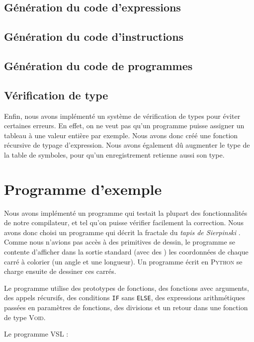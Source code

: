 \documentclass[french]{article}
\begin{document}
  \subsection{Génération du code d'expressions}
  \subsection{Génération du code d'instructions}

  \subsection{Génération du code de programmes}
  \subsection{Vérification de type}
  Enfin, nous avons implémenté un système de vérification de types pour éviter certaines erreurs. En effet, on ne veut pas qu'un programme puisse assigner un tableau à une valeur entière par exemple. Nous avons donc créé une fonction récursive de typage d'expression. Nous avons également dû augmenter le type de la table de symboles, pour qu'un enregistrement retienne aussi son type.

  
\section{Programme d'exemple}
Nous avons implémenté un programme qui testait la plupart des fonctionnalités de notre compilateur, et tel qu'on puisse vérifier facilement la correction. Nous avons donc choisi un programme qui décrit la fractale du \textit{tapis de Sierpinski} . Comme nous n'avions pas accès à des primitives de dessin, le programme se contente d'afficher dans la sortie standard (avec des \iprint) les coordonnées de chaque carré à colorier (un angle et une longueur). Un programme écrit en \textsc{Python} se charge ensuite de dessiner ces carrés.

Le programme utilise des prototypes de fonctions, des fonctions avec arguments, des appels récursifs, des conditions \texttt{IF} sans \texttt{ELSE}, des expressions arithmétiques passées en paramètres de fonctions, des divisions et un retour dans une fonction de type \textsc{Void}.

Le programme \textsc{VSL} :

\end{document}
